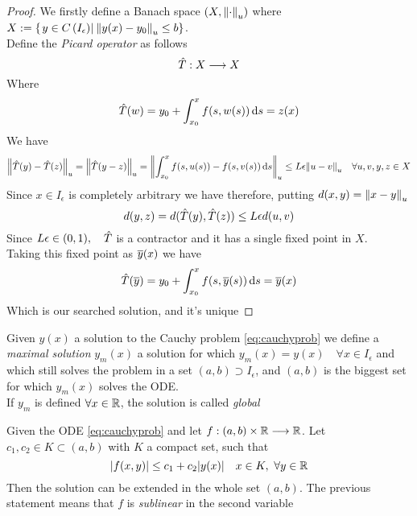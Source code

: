 \documentclass[../complete.tex]{subfiles}
\begin{document}
\begin{proof}
	We firstly define a Banach space $(X,\norm{\cdot}_u)$ where $X:=\left\{ \left.y\in C\left( I_\epsilon \right)\right|_{}\norm{y(x)-y_0}_u\le b \right\}$.\\
	Define the \textit{Picard operator} as follows
	\begin{equation*}
		\hat{T}:X\overset{}{\longrightarrow} X
	\end{equation*}
	Where
	\begin{equation*}
		\hat{T}(w)=y_0+\int_{x_0}^{x}f(s,w(s))\operatorname{d\!} s=z(x)
	\end{equation*}
	We have
	\begin{equation*}
		\norm{\hat{T}(y)-\hat{T}(z)}_u=\norm{\hat{T}(y-z)}_u=\norm{\int_{x_0}^{x}f(s,u(s))-f(s,v(s))\operatorname{d\!} s}_u\le L\epsilon\norm{u-v}_u\quad\forall u,v,y,z\in X
	\end{equation*}
	Since $x\in I_\epsilon$ is completely arbitrary we have therefore, putting $d(x,y)=\norm{x-y}_u$
	\begin{equation*}
		d(y,z)=d(\hat{T}(y),\hat{T}(z))\le L\epsilon d(u,v)
	\end{equation*}
	Since $L\epsilon\in(0,1),\quad\hat{T}$ is a contractor and it has a single fixed point in $X$.\\
	Taking this fixed point as $\overline{y}(x)$ we have
	\begin{equation*}
		\hat{T}(\overline{y})=y_0+\int_{x_0}^{x}f(s,\overline{y}(s))\operatorname{d\!} s=\overline{y}(x)
	\end{equation*}
	Which is our searched solution, and it's unique
\end{proof}
\begin{dfn}
	Given $y(x)$ a solution to the Cauchy problem \eqref{eq:cauchyprob} we define a \textit{maximal solution} $y_m(x)$ a solution for which $y_m(x)=y(x)\quad\forall x\in I_\epsilon$ and which still solves the problem in a set $(a,b)\supset I_\epsilon$, and $(a,b)$ is the biggest set for which $y_m(x)$ solves the ODE.\\
	If $y_m$ is defined $\forall x\in\mathbb{R}$, the solution is called \textit{global}
\end{dfn}
\begin{thm}
	Given the ODE \eqref{eq:cauchyprob} and let $f:(a,b)\times\mathbb{R}\overset{}{\longrightarrow}\mathbb{R}$. Let $c_1,c_2\in K\subset(a,b)$ with $K$ a compact set, such that
	\begin{equation*}
		\abs{f(x,y)}\le c_1+c_2\abs{y(x)}\quad x\in K,\ \forall y\in\mathbb{R}
	\end{equation*}
	Then the solution can be extended in the whole set $(a,b)$. The previous statement means that $f$ is \textit{sublinear} in the second variable
\end{thm}
\end{document}
